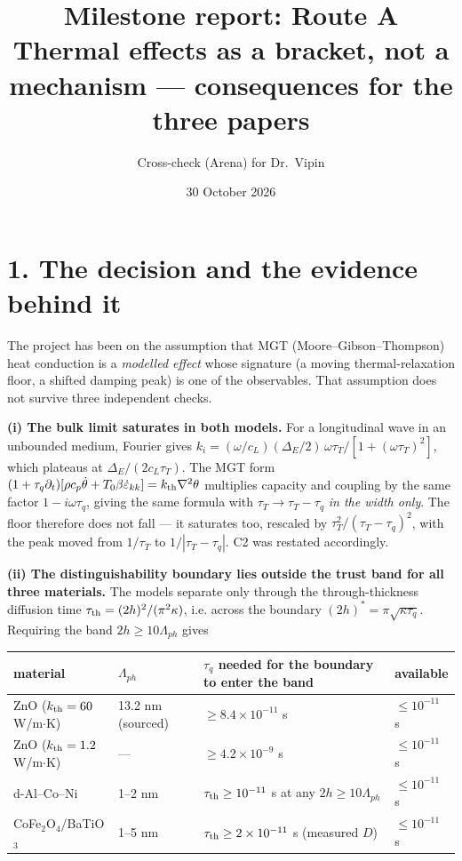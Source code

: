 \documentclass[11pt]{article}
\title{\vspace{-1.2cm}\textbf{Milestone report: Route A}\\[2pt]
\large Thermal effects as a bracket, not a mechanism --- consequences for the three papers}
\author{Cross-check (Arena) for Dr.\ Vipin}
\date{30 October 2026}
\begin{document}
\maketitle
\vspace{-6mm}

\section*{1. The decision and the evidence behind it}

The project has been on the assumption that MGT (Moore--Gibson--Thompson) heat conduction is a
\emph{modelled effect} whose signature (a moving thermal-relaxation floor, a shifted damping peak) is one
of the observables. That assumption does not survive three independent checks.

\textbf{(i) The bulk limit saturates in both models.} For a longitudinal wave in an unbounded medium,
Fourier gives $k_i=(\omega/c_L)(\Delta_E/2)\,\omega\tau_T/[1+(\omega\tau_T)^2]$, which plateaus at
$\Delta_E/(2c_L\tau_T)$. The MGT form $(1+\tau_q\partial_t)[\rho c_p\dot\theta+T_0\beta\dot\varepsilon_{kk}]
=k_{\rm th}\nabla^2\theta$ multiplies capacity and coupling by the same factor $1-i\omega\tau_q$, giving
the same formula with $\tau_T\to\tau_T-\tau_q$ \emph{in the width only}. The floor therefore does not
fall --- it saturates too, rescaled by $\tau_T^2/(\tau_T-\tau_q)^2$, with the peak moved from
$1/\tau_T$ to $1/|\tau_T-\tau_q|$. C2 was restated accordingly.

\textbf{(ii) The distinguishability boundary lies outside the trust band for all three materials.}
The models separate only through the through-thickness diffusion time
$\tau_{\rm th}=(2h)^2/(\pi^2\kappa)$, i.e. across the boundary $(2h)^*=\pi\sqrt{\kappa\tau_q}$. Requiring
the band $2h\ge 10\Lambda_{ph}$ gives

\begin{center}\small
\begin{tabular}{llll}
\toprule
material & $\Lambda_{ph}$ & $\tau_q$ needed for the boundary to enter the band & available\\
\midrule
ZnO ($k_{\rm th}=60$ W/m$\cdot$K) & 13.2 nm (sourced) & $\ge 8.4\times10^{-11}$ s & $\le 10^{-11}$ s\\
ZnO ($k_{\rm th}=1.2$ W/m$\cdot$K) & --- & $\ge 4.2\times10^{-9}$ s & $\le 10^{-11}$ s\\
d-Al--Co--Ni & 1--2 nm & $\tau_{\rm th}\ge 10^{-11}$ s at any $2h\ge 10\Lambda_{ph}$ & $\le 10^{-11}$ s\\
CoFe$_2$O$_4$/BaTiO$_3$ & 1--5 nm & $\tau_{\rm th}\ge 2\times10^{-11}$ s (measured $D$) & $\le 10^{-11}$ s\\
\bottomrule
\end{tabular}
\end{center}
\end{document}
